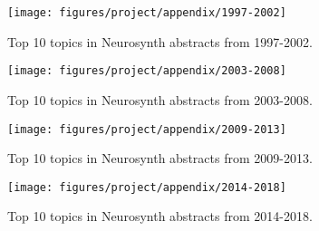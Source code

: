 \begin{figure*}[h]
	\texttt{[image: figures/project/appendix/1997-2002]}
	\caption{Top 10 topics in Neurosynth abstracts from 1997-2002.}
\end{figure*}

\begin{figure*}[h]
	\texttt{[image: figures/project/appendix/2003-2008]}
		\caption{Top 10 topics in Neurosynth abstracts from 2003-2008.}
\end{figure*}

\begin{figure*}[h]
	\texttt{[image: figures/project/appendix/2009-2013]}
		\caption{Top 10 topics in Neurosynth abstracts from 2009-2013.}
\end{figure*}


\begin{figure*}[h]
	\texttt{[image: figures/project/appendix/2014-2018]}
		\caption{Top 10 topics in Neurosynth abstracts from 2014-2018.}
\end{figure*}

